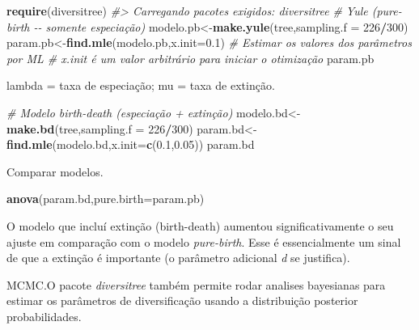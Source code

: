 \documentclass[
]{book}
\newenvironment{Shaded}{\begin{snugshade}}{\end{snugshade}}
\newcommand{\AttributeTok}[1]{\textcolor[rgb]{0.13,0.29,0.53}{#1}}
\newcommand{\CommentTok}[1]{\textcolor[rgb]{0.56,0.35,0.01}{\textit{#1}}}
\newcommand{\DecValTok}[1]{\textcolor[rgb]{0.00,0.00,0.81}{#1}}
\newcommand{\FloatTok}[1]{\textcolor[rgb]{0.00,0.00,0.81}{#1}}
\newcommand{\FunctionTok}[1]{\textcolor[rgb]{0.13,0.29,0.53}{\textbf{#1}}}
\newcommand{\NormalTok}[1]{#1}
\newcommand{\OtherTok}[1]{\textcolor[rgb]{0.56,0.35,0.01}{#1}}
\newcommand{\SpecialCharTok}[1]{\textcolor[rgb]{0.81,0.36,0.00}{\textbf{#1}}}
\begin{document}
\begin{Shaded}
\begin{Highlighting}[]
\FunctionTok{require}\NormalTok{(diversitree)}
\CommentTok{\#\textgreater{} Carregando pacotes exigidos: diversitree}
\CommentTok{\# Yule (pure{-}birth {-}{-} somente especiação)}
\NormalTok{modelo.pb}\OtherTok{\textless{}{-}}\FunctionTok{make.yule}\NormalTok{(tree,}\AttributeTok{sampling.f =} \DecValTok{226}\SpecialCharTok{/}\DecValTok{300}\NormalTok{)}
\NormalTok{param.pb}\OtherTok{\textless{}{-}}\FunctionTok{find.mle}\NormalTok{(modelo.pb,}\AttributeTok{x.init=}\FloatTok{0.1}\NormalTok{) }\CommentTok{\# Estimar os valores dos parâmetros por ML \# x.init é um valor arbitrário para iniciar o otimização}
\NormalTok{param.pb}
\end{Highlighting}
\end{Shaded}

lambda = taxa de especiação; mu = taxa de extinção.

\begin{Shaded}
\begin{Highlighting}[]
\CommentTok{\# Modelo birth{-}death (especiação + extinção)}
\NormalTok{modelo.bd}\OtherTok{\textless{}{-}}\FunctionTok{make.bd}\NormalTok{(tree,}\AttributeTok{sampling.f =} \DecValTok{226}\SpecialCharTok{/}\DecValTok{300}\NormalTok{)}
\NormalTok{param.bd}\OtherTok{\textless{}{-}}\FunctionTok{find.mle}\NormalTok{(modelo.bd,}\AttributeTok{x.init=}\FunctionTok{c}\NormalTok{(}\FloatTok{0.1}\NormalTok{,}\FloatTok{0.05}\NormalTok{))}
\NormalTok{param.bd}
\end{Highlighting}
\end{Shaded}

Comparar modelos.

\begin{Shaded}
\begin{Highlighting}[]
\FunctionTok{anova}\NormalTok{(param.bd,}\AttributeTok{pure.birth=}\NormalTok{param.pb)}
\end{Highlighting}
\end{Shaded}

O modelo que incluí extinção (birth-death) aumentou significativamente o seu ajuste em comparação com o modelo \emph{pure-birth}. Esse é essencialmente um sinal de que a extinção é importante (o parâmetro adicional \emph{d} se justifica).

MCMC.O pacote \emph{diversitree} também permite rodar analises bayesianas
para estimar os parâmetros de diversificação usando a distribuição
posterior probabilidades.
\end{document}
